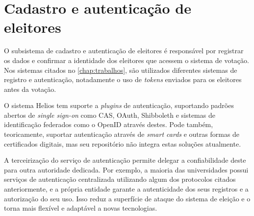 \section{Cadastro e autenticação de eleitores}

O subsistema de cadastro e autenticação de eleitores é responsável por registrar os dados e confirmar a identidade dos eleitores que acessem o sistema de votação. Nos sistemas citados no \autoref{chap:trabalhos}, são utilizados diferentes sistemas de registro e autenticação, notadamente o uso de \textit{tokens} enviados para os eleitores antes da votação.

O sistema Helios tem suporte a \textit{plugins} de autenticação, suportando padrões abertos de \textit{single sign-on} como CAS, OAuth, Shibboleth e sistemas de identificação federados como o OpenID através destes. Pode também, teoricamente, suportar autenticação através de \textit{smart cards} e outras formas de certificados digitais, mas seu repositório não integra estas soluções atualmente.

A terceirização do serviço de autenticação permite delegar a confiabilidade deste para outra autoridade dedicada. Por exemplo, a maioria das universidades possui serviços de autenticação centralizada utilizando algum dos protocolos citados anteriormente, e a própria entidade garante a autenticidade dos seus registros e a autorização do seu uso. Isso reduz a superfície de ataque do sistema de eleição e o torna mais flexível e adaptável a novas tecnologias.
